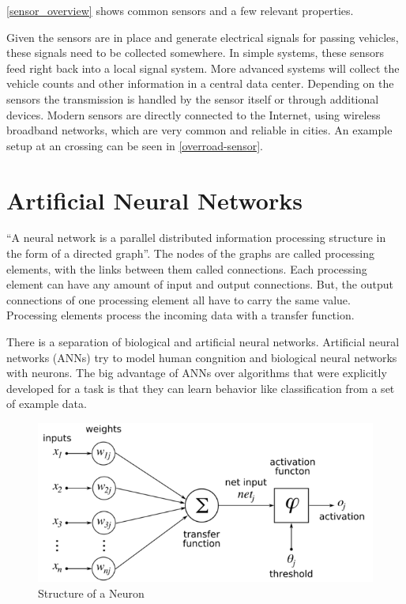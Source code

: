 
\autoref{sensor_overview} shows common sensors and a few relevant properties.

Given the sensors are in place and generate electrical signals for passing vehicles, these signals need to be collected somewhere. In simple systems, these sensors feed right back into a local signal system. More advanced systems will collect the vehicle counts and other information in a central data center. Depending on the sensors the transmission is handled by the sensor itself or through additional devices. Modern sensors are directly connected to the Internet, using wireless broadband networks, which are very common and reliable in cities. An example setup at an crossing can be seen in \autoref{overroad-sensor}.

\section{Artificial Neural Networks}
\label{sec:ann}

``A neural network is a parallel distributed information processing structure in the
form of a directed graph''. \cite{introToNNs} The nodes of the graphs are called processing elements, with the links between them called connections. Each processing element can have any amount of input and output connections. But, the output connections of one processing element all have to carry the same value. Processing elements process the incoming data with a transfer function. \cite{introToNNs}

There is a separation of biological and artificial neural networks. Artificial neural networks (ANNs) try to model human congnition and biological neural networks with neurons. \cite{logicalCalculus1943} 
The big advantage of ANNs over algorithms that were explicitly developed for a task is that they can learn behavior like classification from a set of example data. 

\begin{figure}[ht]
	\centering
  \includegraphics[width=15cm]{figures/neuron_structure}
	\caption[Structure of a Neuron]{Structure of a Neuron \protect\footnotemark}
	\label{neuron}
\end{figure}

